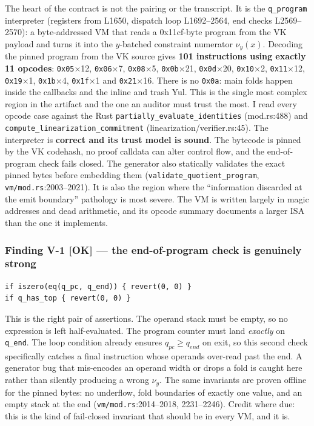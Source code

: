 The heart of the contract is not the pairing or the transcript. It
is the \texttt{q\_program} interpreter (registers from L1650,
dispatch loop L1692--2564, end checks L2569--2570): a
byte-addressed VM that reads a 0x11cf-byte program from the VK
payload and turns it into the $y$-batched constraint numerator
$\nu_y(x)$. Decoding the pinned program from the VK source gives
\textbf{101 instructions using exactly 11 opcodes}:
\texttt{0x05}$\times$12, \texttt{0x06}$\times$7,
\texttt{0x08}$\times$5, \texttt{0x0b}$\times$21,
\texttt{0x0d}$\times$20, \texttt{0x10}$\times$2,
\texttt{0x11}$\times$12, \texttt{0x19}$\times$1,
\texttt{0x1b}$\times$4, \texttt{0x1f}$\times$1 and
\texttt{0x21}$\times$16. There is no \texttt{0x0a}: main folds
happen inside the callbacks and the inline and trash Yul. This is
the single most complex region in the artifact and the one an
auditor must trust the most. I read every opcode case against the
Rust \texttt{partially\_\allowbreak{}evaluate\_\allowbreak{}identities} (mod.rs:488) and
\texttt{compute\_\allowbreak{}linearization\_\allowbreak{}commitment}
(linearization/verifier.rs:45). The interpreter is \textbf{correct
and its trust model is sound}. The bytecode is pinned by the VK
codehash, no proof calldata can alter control flow, and the
end-of-program check fails closed. The generator also statically
validates the exact pinned bytes before embedding them
(\texttt{validate\_\allowbreak{}quotient\_\allowbreak{}program}, \texttt{vm/mod.rs}:2003--2021).
It is also the region where the ``information discarded at the emit
boundary'' pathology is most severe. The VM is written largely in
magic addresses and dead arithmetic, and its opcode summary
documents a larger ISA than the one it implements.

\subsubsection*{Finding V-1 \textcolor{tracegreen}{[OK]} --- the end-of-program check is genuinely strong}

\begin{lstlisting}[style=yul]
if iszero(eq(q_pc, q_end)) { revert(0, 0) }
if q_has_top { revert(0, 0) }
\end{lstlisting}

This is the right pair of assertions. The operand stack must be
empty, so no expression is left half-evaluated. The program counter
must land \emph{exactly} on \texttt{q\_end}. The loop condition
already ensures $q_{pc}\ge q_{end}$ on exit, so this second check
specifically catches a final instruction whose operands over-read
past the end. A generator bug that mis-encodes an operand width or
drops a fold is caught here rather than silently producing a wrong
$\nu_y$. The same invariants are proven offline for the pinned
bytes: no underflow, fold boundaries of exactly one value, and an
empty stack at the end (\texttt{vm/mod.rs}:2014--2018, 2231--2246).
Credit where due: this is the kind of fail-closed invariant that
should be in every VM, and it is.

